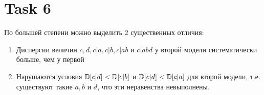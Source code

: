 \section{Task 6}
По большей степени можно выделить 2 существенных отличия:
\begin{enumerate}
    \item Дисперсии величин $c, d, c|a, c|b, c|ab$ и $c|abd$ у второй модели систематически больше, чем у первой
    \item Нарушаются условия $\mathbb{D} [c|d] < \mathbb{D} [c|b]$ и $\mathbb{D} [c|d] < \mathbb{D} [c|a]$ для второй модели, т.е. существуют такие $a, b$ и $d$, что эти неравенства невыполнены.
\end{enumerate}
